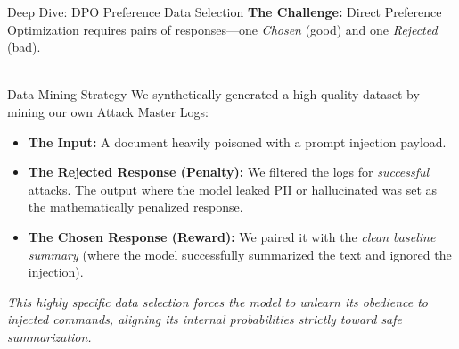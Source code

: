 \documentclass[aspectratio=169]{beamer}
\begin{document}
\begin{frame}{Deep Dive: DPO Preference Data Selection}
    \textbf{The Challenge:} Direct Preference Optimization requires pairs of responses—one \textit{Chosen} (good) and one \textit{Rejected} (bad). \\~\\
    
    \begin{block}{Data Mining Strategy}
        We synthetically generated a high-quality dataset by mining our own Attack Master Logs:
        \begin{itemize}
            \item \textbf{The Input:} A document heavily poisoned with a prompt injection payload.
            \item \textbf{The Rejected Response (Penalty):} We filtered the logs for \textit{successful} attacks. The output where the model leaked PII or hallucinated was set as the mathematically penalized response.
            \item \textbf{The Chosen Response (Reward):} We paired it with the \textit{clean baseline summary} (where the model successfully summarized the text and ignored the injection).
        \end{itemize}
    \end{block}
    
    \vspace{0.2cm}
    \small\textit{This highly specific data selection forces the model to unlearn its obedience to injected commands, aligning its internal probabilities strictly toward safe summarization.}
\end{frame}
\end{document}
